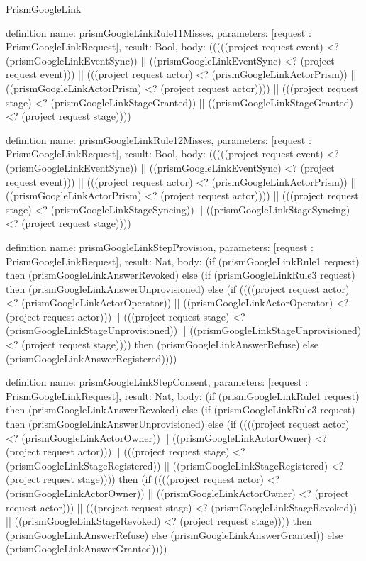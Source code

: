 \begin{lexlean}{PrismGoogleLink}
\begin{semanticmodule}
definition{
  name: prismGoogleLinkRule11Misses,
  parameters: [request : PrismGoogleLinkRequest],
  result: Bool,
  body: (((((project request event) <? (prismGoogleLinkEventSync)) || ((prismGoogleLinkEventSync) <? (project request event))) || (((project request actor) <? (prismGoogleLinkActorPrism)) || ((prismGoogleLinkActorPrism) <? (project request actor)))) || (((project request stage) <? (prismGoogleLinkStageGranted)) || ((prismGoogleLinkStageGranted) <? (project request stage))))
}

definition{
  name: prismGoogleLinkRule12Misses,
  parameters: [request : PrismGoogleLinkRequest],
  result: Bool,
  body: (((((project request event) <? (prismGoogleLinkEventSync)) || ((prismGoogleLinkEventSync) <? (project request event))) || (((project request actor) <? (prismGoogleLinkActorPrism)) || ((prismGoogleLinkActorPrism) <? (project request actor)))) || (((project request stage) <? (prismGoogleLinkStageSyncing)) || ((prismGoogleLinkStageSyncing) <? (project request stage))))
}

definition{
  name: prismGoogleLinkStepProvision,
  parameters: [request : PrismGoogleLinkRequest],
  result: Nat,
  body: (if (prismGoogleLinkRule1 request) then (prismGoogleLinkAnswerRevoked) else (if (prismGoogleLinkRule3 request) then (prismGoogleLinkAnswerUnprovisioned) else (if ((((project request actor) <? (prismGoogleLinkActorOperator)) || ((prismGoogleLinkActorOperator) <? (project request actor))) || (((project request stage) <? (prismGoogleLinkStageUnprovisioned)) || ((prismGoogleLinkStageUnprovisioned) <? (project request stage)))) then (prismGoogleLinkAnswerRefuse) else (prismGoogleLinkAnswerRegistered))))
}

definition{
  name: prismGoogleLinkStepConsent,
  parameters: [request : PrismGoogleLinkRequest],
  result: Nat,
  body: (if (prismGoogleLinkRule1 request) then (prismGoogleLinkAnswerRevoked) else (if (prismGoogleLinkRule3 request) then (prismGoogleLinkAnswerUnprovisioned) else (if ((((project request actor) <? (prismGoogleLinkActorOwner)) || ((prismGoogleLinkActorOwner) <? (project request actor))) || (((project request stage) <? (prismGoogleLinkStageRegistered)) || ((prismGoogleLinkStageRegistered) <? (project request stage)))) then (if ((((project request actor) <? (prismGoogleLinkActorOwner)) || ((prismGoogleLinkActorOwner) <? (project request actor))) || (((project request stage) <? (prismGoogleLinkStageRevoked)) || ((prismGoogleLinkStageRevoked) <? (project request stage)))) then (prismGoogleLinkAnswerRefuse) else (prismGoogleLinkAnswerGranted)) else (prismGoogleLinkAnswerGranted))))
}


\end{semanticmodule}
\end{lexlean}
